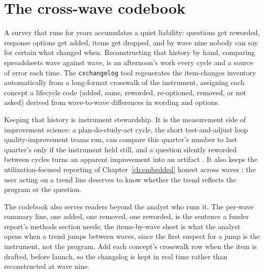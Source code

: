 \documentclass[
    a4paper,
    fontsize=10pt,
    twoside=true,
    numbers=noenddot,
]{kaobook}
\begin{document}
\section{The cross-wave codebook}\label{sec:cxchangelog}
A survey that runs for years accumulates a quiet liability: questions get reworded, response options get added, items get dropped, and by wave nine nobody can say for certain what changed when. Reconstructing that history by hand, comparing spreadsheets wave against wave, is an afternoon's work every cycle and a source of error each time. The \texttt{cxchangelog} tool regenerates the item-changes inventory automatically from a long-format crosswalk of the instrument, assigning each concept a lifecycle code (added, same, reworded, re-optioned, removed, or not asked) derived from wave-to-wave differences in wording and options.

Keeping that history is instrument stewardship. It is the measurement side of improvement science: a plan-do-study-act cycle, the short test-and-adjust loop quality-improvement teams run, can compare this quarter's number to last quarter's only if the instrument held still, and a question silently reworded between cycles turns an apparent improvement into an artifact \parencite{bryk2015improve}. It also keeps the utilization-focused reporting of Chapter~\ref{ch:embedded} honest across waves \parencite{patton2008utilization}: the user acting on a trend line deserves to know whether the trend reflects the program or the question.

The codebook also serves readers beyond the analyst who runs it. The per-wave summary line, one added, one removed, one reworded, is the sentence a funder report's methods section needs; the items-by-wave sheet is what the analyst opens when a trend jumps between waves, since the first suspect for a jump is the instrument, not the program. Add each concept's crosswalk row when the item is drafted, before launch, so the changelog is kept in real time rather than reconstructed at wave nine.
\end{document}
